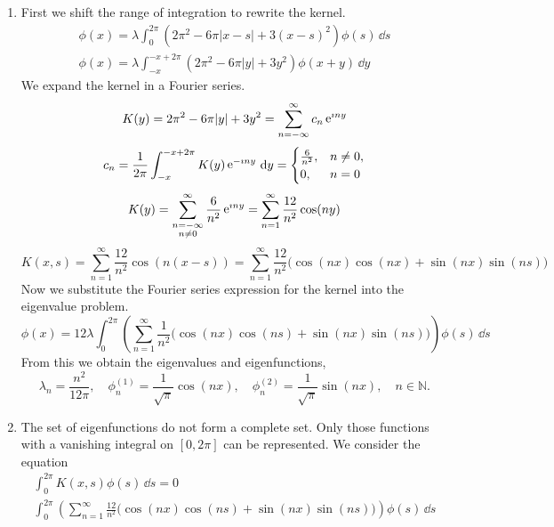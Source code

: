 \begin{Solution}
  \begin{enumerate}
  \item
    First we shift the range of integration to rewrite the kernel.
    \begin{gather*}
      \phi(x) = \lambda \int_0^{2 \pi} \left( 2 \pi^2 - 6 \pi |x-s| + 3 (x-s)^2 
      \right) \phi(s) \,\dd s \\
      \phi(x) = \lambda \int_{-x}^{-x + 2 \pi} \left( 2 \pi^2 - 6 \pi |y| + 3 y^2 
      \right) \phi(x+y) \,\dd y 
    \end{gather*}
    We expand the kernel in a Fourier series.
    \[
    K(y) = 2 \pi^2 - 6 \pi |y| + 3 y^2 = \sum_{n = -\infty}^\infty c_n \mathop{\mathrm{e}}\nolimits^{\imath n y}
    \]
    \[
    c_n = \frac{1}{2 \pi} \int_{-x}^{-x+2\pi} K(y) \mathop{\mathrm{e}}\nolimits^{-\imath n y} \,\mathrm{d} y = 
    \begin{cases}
      \frac{6}{n^2}, &n \neq 0, \\
      0,      &n = 0
    \end{cases}
    \]
    \[
    K(y) = \sum_{\substack{n = -\infty \\ n \neq 0}}^\infty \frac{6}{n^2} 
    \mathop{\mathrm{e}}\nolimits^{\imath n y} 
    = \sum_{n = 1}^\infty \frac{12}{n^2} \cos(n y) 
    \]
    \[
    K(x,s) = \sum_{n = 1}^\infty \frac{12}{n^2} \cos(n (x-s)) 
    = \sum_{n = 1}^\infty \frac{12}{n^2} \big( \cos(n x) \cos(n x) 
    + \sin(n x) \sin(n s) \big)
    \]
    Now we substitute the Fourier series expression for the kernel into the
    eigenvalue problem.
    \[
    \phi(x) = 12 \lambda \int_0^{2\pi} \left( \sum_{n = 1}^\infty \frac{1}{n^2} \big(
      \cos(n x) \cos(n s) + \sin(n x) \sin(n s) \big) \right) \phi(s) \,\dd s
    \]
    From this we obtain the eigenvalues and eigenfunctions,
    \[
    \boxed{
      \lambda_n = \frac{n^2}{12 \pi}, 
      \quad \phi_n^{(1)} = \frac{1}{\sqrt{\pi}} \cos(n x), 
      \quad \phi_n^{(2)} = \frac{1}{\sqrt{\pi}} \sin(n x), 
      \quad n \in \mathbb{N}.
      }
    \]
  \item
    The set of eigenfunctions do not form a complete set.  Only those functions
    with a vanishing integral on $[0,2\pi]$ can be represented.  We consider the
    equation
    \begin{gather*}
      \int_0^{2\pi} K(x,s) \phi(s) \,\dd s = 0 \\
      \int_0^{2\pi} \left( \sum_{n = 1}^\infty \frac{12}{n^2} \big(
        \cos(n x) \cos(n s) + \sin(n x) \sin(n s) \big) \right) \phi(s) \,\dd s

\end{gather*}
\end{enumerate}
\end{Solution}

